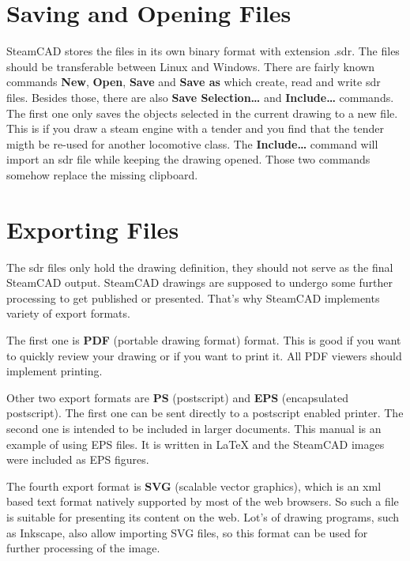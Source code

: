 \section{Saving and Opening Files}

SteamCAD stores the files in its own binary format with extension .sdr. The files
should be transferable between Linux and Windows. There are fairly known commands
\textbf{New}, \textbf{Open}, \textbf{Save} and \textbf{Save as} which create,
read and write sdr files. Besides those, there are also \textbf{Save Selection\dots}
and \textbf{Include\dots} commands. The first one only saves the objects selected
in the current drawing to a new file. This is if you draw a steam engine with a
tender and you find that the tender migth be re-used for another locomotive class.
The \textbf{Include\dots} command will import an sdr file while keeping the drawing
opened. Those two commands somehow replace the missing clipboard.

\section{Exporting Files}\label{sec:export}

The sdr files only hold the drawing definition, they should not serve as the final
SteamCAD output. SteamCAD drawings are supposed to undergo some further processing
to get published or presented. That's why SteamCAD implements variety of export
formats.

The first one is \textbf{PDF} (portable drawing format) format. This is good if you
want to quickly review your drawing or if you want to print it. All PDF viewers should
implement printing.

Other two export formats are \textbf{PS} (postscript) and \textbf{EPS} (encapsulated
postscript). The first one can be sent directly to a postscript enabled printer.
The second one is intended to be included in larger documents. This manual is an
example of using EPS files. It is written in \LaTeX{} and the SteamCAD images were
included as EPS figures.

The fourth export format is \textbf{SVG} (scalable vector graphics), which is an xml
based text format natively supported by most of the web browsers. So such a file
is suitable for presenting its content on the web. Lot's of drawing programs,
such as Inkscape, also allow importing SVG files, so this format can be used for
further processing of the image.

